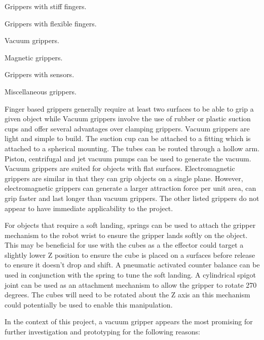 \begin{compactitem}
    \item Grippers with stiff fingers.
    \item Grippers with flexible fingers.
    \item Vacuum grippers.
    \item Magnetic grippers.
    \item Grippers with sensors.
    \item Miscellaneous grippers.
\end{compactitem}

Finger based grippers generally require at least two surfaces to be able to grip a given object while Vacuum grippers involve the use of rubber or plastic suction cups and offer several advantages over clamping grippers. Vacuum grippers are light and simple to build. The suction cup can be attached to a fitting which is attached to a spherical mounting. The tubes can be routed through a hollow arm. Piston, centrifugal and jet vacuum pumps can be used to generate the vacuum. Vacuum grippers are suited for objects with flat surfaces. Electromagnetic grippers are similar in that they can grip objects on a single plane. However, electromagnetic grippers can generate a larger attraction force per unit area, can grip faster and last longer than vacuum grippers. The other listed grippers do not appear to have immediate applicability to the project.

For objects that require a soft landing, springs can be used to attach the gripper mechanism to the robot wrist to ensure the gripper lands softly on the object. This may be beneficial for use with the cubes as a the effector could target a slightly lower Z position to ensure the cube is placed on a surfaces before release to ensure it doesn't drop and shift. A pneumatic activated counter balance can be used in conjunction with the spring to tune the soft landing. A cylindrical spigot joint can be used as an attachment mechanism to allow the gripper to rotate 270 degrees. The cubes will need to be rotated about the Z axis an this mechanism could potentially be used to enable this manipulation.

In the context of this project, a vacuum gripper appears the most promising for further investigation and prototyping for the following reasons:

